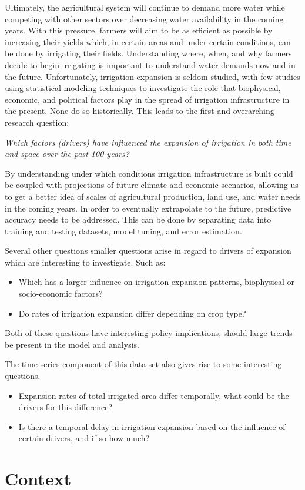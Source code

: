 \documentclass[12pt,twoside]{reedthesis}
\begin{document}
Ultimately, the agricultural system will continue to demand more water while competing with other sectors over decreasing water availability in the coming years. With this pressure, farmers will aim to be as efficient as possible by increasing their yields which, in certain areas and under certain conditions, can be done by irrigating their fields. Understanding where, when, and why farmers decide to begin irrigating is important to understand water demands now and in the future. Unfortunately, irrigation expansion is seldom studied, with few studies using statistical modeling techniques to investigate the role that biophysical, economic, and political factors play in the spread of irrigation infrastructure in the present. None do so historically. This leads to the first and overarching research question:

\emph{Which factors (drivers) have influenced the expansion of irrigation in both time and space over the past 100 years?}

By understanding under which conditions irrigation infrastructure is built could be coupled with projections of future climate and economic scenarios, allowing us to get a better idea of scales of agricultural production, land use, and water needs in the coming years. In order to eventually extrapolate to the future, predictive accuracy needs to be addressed. This can be done by separating data into training and testing datasets, model tuning, and error estimation.

Several other questions smaller questions arise in regard to drivers of expansion which are interesting to investigate. Such as:
\begin{itemize}
\item
  Which has a larger influence on irrigation expansion patterns, biophysical or socio-economic factors?
\item
  Do rates of irrigation expansion differ depending on crop type?
\end{itemize}
Both of these questions have interesting policy implications, should large trends be present in the model and analysis.

The time series component of this data set also gives rise to some interesting questions.
\begin{itemize}
\item
  Expansion rates of total irrigated area differ temporally, what could be the drivers for this difference?
\item
  Is there a temporal delay in irrigation expansion based on the influence of certain drivers, and if so how much?
\end{itemize}
\hypertarget{Theory}{%
\chapter{Context}\label{Theory}}
\end{document}
